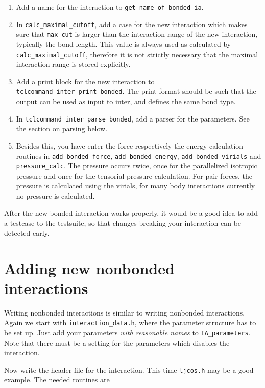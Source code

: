 \documentclass[
a4paper,                        %
11pt,                           %
twoside,                        %
footsepline,                    %
headsepline,                    %
headexclude,                    %
footexclude,                    %
pagesize,                       %
bibtotocnumbered,               %
idxtotoc                        %
]{scrreprt}
\begin{document}
\begin{enumerate}
\item Add a name for the interaction to \verb!get_name_of_bonded_ia!.
\item In \verb!calc_maximal_cutoff!, add a case for the new
  interaction which makes sure that \verb!max_cut! is larger than the
  interaction range of the new interaction, typically the bond
  length. This value is always used as calculated by
  \verb!calc_maximal_cutoff!, therefore it is not strictly necessary
  that the maximal interaction range is stored explicitly.
\item Add a print block for the new interaction to
  \verb!tclcommand_inter_print_bonded!. The print format should be
  such that the output can be used as input to inter, and defines the
  same bond type.
\item In \verb!tclcommand_inter_parse_bonded!,
  add a parser for the parameters. See the section on parsing below.
\item Besides this, you have enter the force respectively the energy
  calculation routines in \verb!add_bonded_force!,
  \verb!add_bonded_energy!, \verb!add_bonded_virials! and
  \verb!pressure_calc!. The pressure occurs twice, once for the
  parallelized isotropic pressure and once for the tensorial pressure
  calculation. For pair forces, the pressure is calculated using the
  virials, for many body interactions currently no pressure is
  calculated.
\end{enumerate}

After the new bonded interaction works properly, it would be a good
idea to add a testcase to the testsuite, so that changes breaking your
interaction can be detected early.

\section{Adding new nonbonded interactions}

Writing nonbonded interactions is similar to writing nonbonded
interactions. Again we start with \verb!interaction_data.h!, where the
parameter structure has to be set up. Just add your parameters
\emph{with reasonable names} to \verb!IA_parameters!. Note that there
must be a setting for the parameters which disables the interaction.

Now write the header file for the interaction. This time
\verb!ljcos.h! may be a good example. The needed routines are
\end{document}
